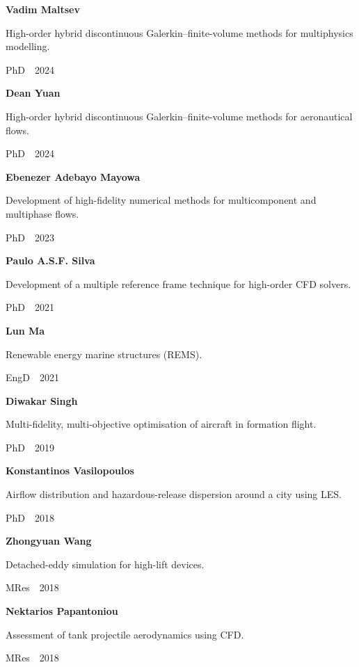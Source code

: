 \documentclass[11pt,a4paper]{article}
\newlength{\cventrysep}
\newenvironment{cventry}{%
  \par\noindent\begin{minipage}{\linewidth}
  \RaggedRight\fontsize{9.8}{12.5}\selectfont
}{\end{minipage}\par\addvspace{\cventrysep}}
\newcommand{\cvtitle}[1]{{\bfseries #1\par}\vspace{1pt}}
\newcommand{\cvdetail}[1]{{#1\par}\vspace{1pt}}
\newcommand{\cvmeta}[1]{{\fontsize{9}{11.5}\selectfont\color{Muted}#1\par}\vspace{1pt}}
\begin{document}
\begin{cventry}
\cvtitle{Vadim Maltsev}
\cvdetail{High-order hybrid discontinuous Galerkin--finite-volume methods for multiphysics modelling.}
\cvmeta{PhD \,\textperiodcentered{}\, 2024}
\end{cventry}

\begin{cventry}
\cvtitle{Dean Yuan}
\cvdetail{High-order hybrid discontinuous Galerkin--finite-volume methods for aeronautical flows.}
\cvmeta{PhD \,\textperiodcentered{}\, 2024}
\end{cventry}

\begin{cventry}
\cvtitle{Ebenezer Adebayo Mayowa}
\cvdetail{Development of high-fidelity numerical methods for multicomponent and multiphase flows.}
\cvmeta{PhD \,\textperiodcentered{}\, 2023}
\end{cventry}

\begin{cventry}
\cvtitle{Paulo A.S.F. Silva}
\cvdetail{Development of a multiple reference frame technique for high-order CFD solvers.}
\cvmeta{PhD \,\textperiodcentered{}\, 2021}
\end{cventry}

\begin{cventry}
\cvtitle{Lun Ma}
\cvdetail{Renewable energy marine structures (REMS).}
\cvmeta{EngD \,\textperiodcentered{}\, 2021}
\end{cventry}

\begin{cventry}
\cvtitle{Diwakar Singh}
\cvdetail{Multi-fidelity, multi-objective optimisation of aircraft in formation flight.}
\cvmeta{PhD \,\textperiodcentered{}\, 2019}
\end{cventry}

\begin{cventry}
\cvtitle{Konstantinos Vasilopoulos}
\cvdetail{Airflow distribution and hazardous-release dispersion around a city using LES.}
\cvmeta{PhD \,\textperiodcentered{}\, 2018}
\end{cventry}

\begin{cventry}
\cvtitle{Zhongyuan Wang}
\cvdetail{Detached-eddy simulation for high-lift devices.}
\cvmeta{MRes \,\textperiodcentered{}\, 2018}
\end{cventry}

\begin{cventry}
\cvtitle{Nektarios Papantoniou}
\cvdetail{Assessment of tank projectile aerodynamics using CFD.}
\cvmeta{MRes \,\textperiodcentered{}\, 2018}
\end{cventry}
\end{document}
